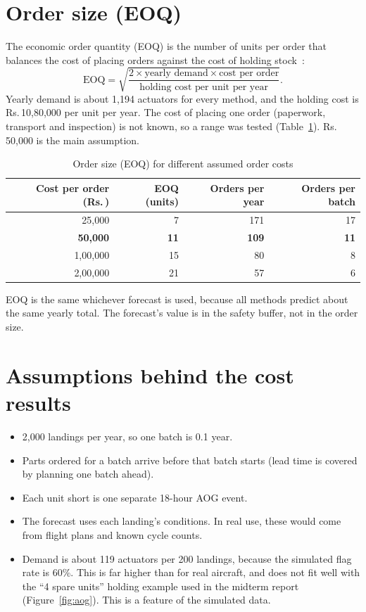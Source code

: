 \documentclass[12pt,oneside]{report}
\newcommand{\INR}{Rs.\,}
\newcommand{\gl}[2]{\phantomsection\label{gl:#1}#2}
\begin{document}
\section{Order size (EOQ)}
The \gl{eoq}{economic order quantity (EOQ)} is the number of units per order that balances the cost of placing orders against the cost of holding stock~\cite{harris1913}:
\[
\text{EOQ} = \sqrt{\frac{2 \times \text{yearly demand} \times \text{cost per order}}{\text{holding cost per unit per year}}}.
\]
Yearly demand is about 1,194 actuators for every method, and the holding cost is \INR 10,80,000 per unit per year. The cost of placing one order (paperwork, transport and inspection) is not known, so a range was tested (Table~\ref{tab:eoq}). \INR 50,000 is the main assumption.

\begin{table}[htbp]
\centering\small
\caption[Order size for different order costs]{Order size (EOQ) for different assumed order costs}
\label{tab:eoq}
\begin{tabular}{@{}rrrr@{}}
\toprule
\textbf{Cost per order (\INR)} & \textbf{EOQ (units)} & \textbf{Orders per year} & \textbf{Orders per batch}\\
\midrule
25,000 & 7 & 171 & 17\\
\textbf{50,000} & \textbf{11} & \textbf{109} & \textbf{11}\\
1,00,000 & 15 & 80 & 8\\
2,00,000 & 21 & 57 & 6\\
\bottomrule
\end{tabular}
\end{table}

EOQ is the same whichever forecast is used, because all methods predict about the same yearly total. The forecast's value is in the safety buffer, not in the order size.

\section{Assumptions behind the cost results}
\begin{itemize}
\item 2,000 landings per year, so one batch is 0.1 year.
\item Parts ordered for a batch arrive before that batch starts (\gl{leadtime}{lead time} is covered by planning one batch ahead).
\item Each unit short is one separate 18-hour AOG event.
\item The forecast uses each landing's conditions. In real use, these would come from flight plans and known cycle counts.
\item Demand is about 119 actuators per 200 landings, because the simulated flag rate is 60\%. This is far higher than for real aircraft, and does not fit well with the ``4 spare units'' holding example used in the midterm report (Figure~\ref{fig:aog}). This is a feature of the simulated data.
\end{itemize}
\end{document}
